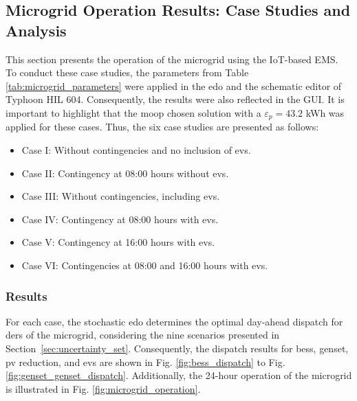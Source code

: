\documentclass[preprint, 12pt, 3p]{elsarticle}
\begin{document}
\subsection{Microgrid Operation Results: Case Studies and Analysis}\label{subsec:case_studies}

This section presents the operation of the microgrid using the IoT-based EMS. To conduct these case studies, the parameters from 
Table \ref{tab:microgrid_parameters} were applied in the \gls{edo} and 
the schematic editor of Typhoon HIL 604. Consequently, the results were also reflected in the GUI. 
It is important to highlight that the \gls{moop} chosen solution with 
a $\varepsilon_{p} = 43.2$ kWh was applied for these cases. Thus, the six case studies are presented as follows:

\begin{itemize}
    \item Case I: Without contingencies and no inclusion of \glspl{ev}.
    \item Case II: Contingency at 08:00 hours without \glspl{ev}.
    \item Case III: Without contingencies, including \glspl{ev}.
    \item Case IV: Contingency at 08:00 hours with  \glspl{ev}. 
    \item Case V: Contingency at 16:00 hours with \glspl{ev}.
    \item Case VI: Contingencies at 08:00 and 16:00 hours with \glspl{ev}. 

\end{itemize}

\subsubsection{Results}\label{subsec:results}

For each case, the stochastic \gls{edo} determines
the optimal day-ahead dispatch for \gls{der}s of the microgrid, considering the nine scenarios presented in Section~\ref{sec:uncertainty_set}. Consequently, the dispatch results 
for \gls{bess}, \gls{genset}, \gls{pv} reduction, and \glspl{ev} 
are shown in Fig. \ref{fig:bess_dispatch} to 
Fig. \ref{fig:genset_genset_dispatch}. Additionally, the 24-hour operation of 
the microgrid is illustrated in Fig. \ref{fig:microgrid_operation}.
\end{document}
